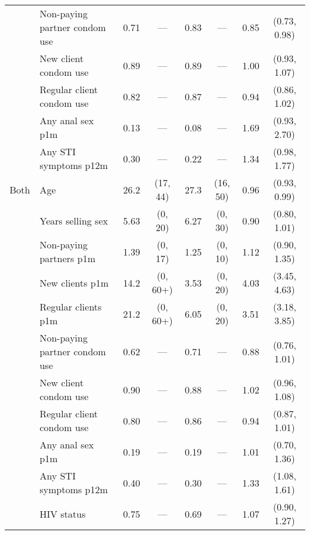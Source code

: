 \begin{tabular}{llRcRcRc}
  & Non-paying partner condom use  & 0.71 &    ---     & 0.83 &   ---    & 0.85 & (0.73, 0.98) \\
  & New client condom use          & 0.89 &    ---     & 0.89 &   ---    & 1.00 & (0.93, 1.07) \\
  & Regular client condom use      & 0.82 &    ---     & 0.87 &   ---    & 0.94 & (0.86, 1.02) \\
  & Any anal sex p1m               & 0.13 &    ---     & 0.08 &   ---    & 1.69 & (0.93, 2.70) \\
  & Any STI symptoms p12m          & 0.30 &    ---     & 0.22 &   ---    & 1.34 & (0.98, 1.77) \\
  \midrule Both
  & Age                                  & 26.2 &  (17, 44)  & 27.3 & (16, 50) & 0.96 & (0.93, 0.99) \\
  & Years selling sex                    & 5.63 &  (0, 20)   & 6.27 & (0, 30)  & 0.90 & (0.80, 1.01) \\
  & Non-paying partners p1m              & 1.39 &  (0, 17)   & 1.25 & (0, 10)  & 1.12 & (0.90, 1.35) \\
  & New clients p1m                      & 14.2 &  (0, 60+)  & 3.53 & (0, 20)  & 4.03 & (3.45, 4.63) \\
  & Regular clients p1m                  & 21.2 &  (0, 60+)  & 6.05 & (0, 20)  & 3.51 & (3.18, 3.85) \\
  & Non-paying partner condom use  & 0.62 &    ---     & 0.71 &   ---    & 0.88 & (0.76, 1.01) \\
  & New client condom use          & 0.90 &    ---     & 0.88 &   ---    & 1.02 & (0.96, 1.08) \\
  & Regular client condom use      & 0.80 &    ---     & 0.86 &   ---    & 0.94 & (0.87, 1.01) \\
  & Any anal sex p1m               & 0.19 &    ---     & 0.19 &   ---    & 1.01 & (0.70, 1.36) \\
  & Any STI symptoms p12m          & 0.40 &    ---     & 0.30 &   ---    & 1.33 & (1.08, 1.61) \\
  & HIV status                    & 0.75 &    ---     & 0.69 &   ---    & 1.07 & (0.90, 1.27) \\
  \bottomrule
\end{tabular}

